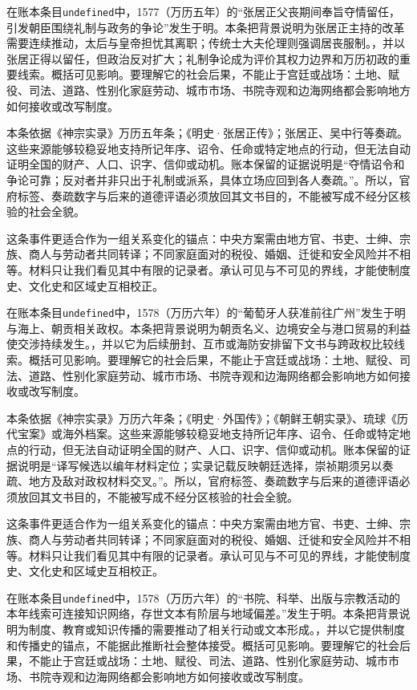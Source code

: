 在账本条目\texttt{undefined}中，1577（万历五年）的“张居正父丧期间奉旨夺情留任，引发朝臣围绕礼制与政务的争论”发生于明。本条把背景说明为张居正主持的改革需要连续推动，太后与皇帝担忧其离职；传统士大夫伦理则强调居丧服制。，并以张居正得以留任，但政治反对扩大；礼制争论成为评价其权力边界和万历初政的重要线索。概括可见影响。要理解它的社会后果，不能止于宫廷或战场：土地、赋役、司法、道路、性别化家庭劳动、城市市场、书院寺观和边海网络都会影响地方如何接收或改写制度。

本条依据《神宗实录》万历五年条；《明史·张居正传》；张居正、吴中行等奏疏。这些来源能够较稳妥地支持所记年序、诏令、任命或特定地点的行动，但无法自动证明全国的财产、人口、识字、信仰或动机。账本保留的证据说明是“夺情诏令和争论可靠；反对者并非只出于礼制或派系，具体立场应回到各人奏疏。”。所以，官府标签、奏疏数字与后来的道德评语必须放回其文书目的，不能被写成不经分区核验的社会全貌。

这条事件更适合作为一组关系变化的锚点：中央方案需由地方官、书吏、士绅、宗族、商人与劳动者共同转译；不同家庭面对的税役、婚姻、迁徙和安全风险并不相等。材料只让我们看见其中有限的记录者。承认可见与不可见的界线，才能使制度史、文化史和区域史互相校正。

在账本条目\texttt{undefined}中，1578（万历六年）的“葡萄牙人获准前往广州”发生于明与海上、朝贡相关政权。本条把背景说明为朝贡名义、边境安全与港口贸易的利益使交涉持续发生。，并以它为后续册封、互市或海防安排留下文书与跨政权比较线索。概括可见影响。要理解它的社会后果，不能止于宫廷或战场：土地、赋役、司法、道路、性别化家庭劳动、城市市场、书院寺观和边海网络都会影响地方如何接收或改写制度。

本条依据《神宗实录》万历六年条；《明史·外国传》；《朝鲜王朝实录》、琉球《历代宝案》或海外档案。这些来源能够较稳妥地支持所记年序、诏令、任命或特定地点的行动，但无法自动证明全国的财产、人口、识字、信仰或动机。账本保留的证据说明是“译写候选以编年材料定位；实录记载反映朝廷选择，崇祯期须另以奏疏、地方及敌对政权材料交叉。”。所以，官府标签、奏疏数字与后来的道德评语必须放回其文书目的，不能被写成不经分区核验的社会全貌。

这条事件更适合作为一组关系变化的锚点：中央方案需由地方官、书吏、士绅、宗族、商人与劳动者共同转译；不同家庭面对的税役、婚姻、迁徙和安全风险并不相等。材料只让我们看见其中有限的记录者。承认可见与不可见的界线，才能使制度史、文化史和区域史互相校正。

在账本条目\texttt{undefined}中，1578（万历六年）的“书院、科举、出版与宗教活动的本年线索可连接知识网络，存世文本有阶层与地域偏差。”发生于明。本条把背景说明为制度、教育或知识传播的需要推动了相关行动或文本形成。，并以它提供制度和传播史的锚点，不能据此推断社会整体接受。概括可见影响。要理解它的社会后果，不能止于宫廷或战场：土地、赋役、司法、道路、性别化家庭劳动、城市市场、书院寺观和边海网络都会影响地方如何接收或改写制度。

